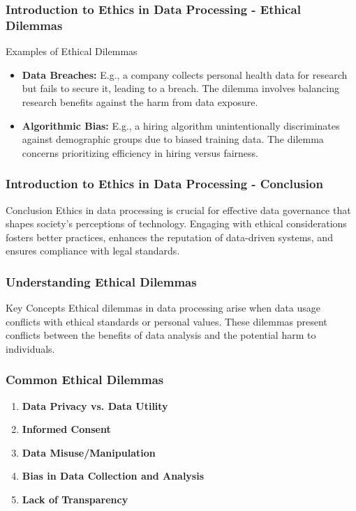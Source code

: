 \documentclass{beamer}
\begin{document}
\begin{frame}[fragile]
    \frametitle{Introduction to Ethics in Data Processing - Ethical Dilemmas}
    \begin{block}{Examples of Ethical Dilemmas}
        \begin{itemize}
            \item \textbf{Data Breaches:} 
            E.g., a company collects personal health data for research but fails to secure it, leading to a breach. The dilemma involves balancing research benefits against the harm from data exposure.
            
            \item \textbf{Algorithmic Bias:} 
            E.g., a hiring algorithm unintentionally discriminates against demographic groups due to biased training data. The dilemma concerns prioritizing efficiency in hiring versus fairness.
        \end{itemize}
    \end{block}
\end{frame}

\begin{frame}[fragile]
    \frametitle{Introduction to Ethics in Data Processing - Conclusion}
    \begin{block}{Conclusion}
        Ethics in data processing is crucial for effective data governance that shapes society's perceptions of technology. Engaging with ethical considerations fosters better practices, enhances the reputation of data-driven systems, and ensures compliance with legal standards.
    \end{block}
\end{frame}

\begin{frame}[fragile]
    \frametitle{Understanding Ethical Dilemmas}
    \begin{block}{Key Concepts}
        Ethical dilemmas in data processing arise when data usage conflicts with ethical standards or personal values. These dilemmas present conflicts between the benefits of data analysis and the potential harm to individuals.
    \end{block}
\end{frame}

\begin{frame}[fragile]
    \frametitle{Common Ethical Dilemmas}
    \begin{enumerate}
        \item \textbf{Data Privacy vs. Data Utility}
        \item \textbf{Informed Consent}
        \item \textbf{Data Misuse/Manipulation}
        \item \textbf{Bias in Data Collection and Analysis}
        \item \textbf{Lack of Transparency}
    \end{enumerate}
\end{frame}
\end{document}
